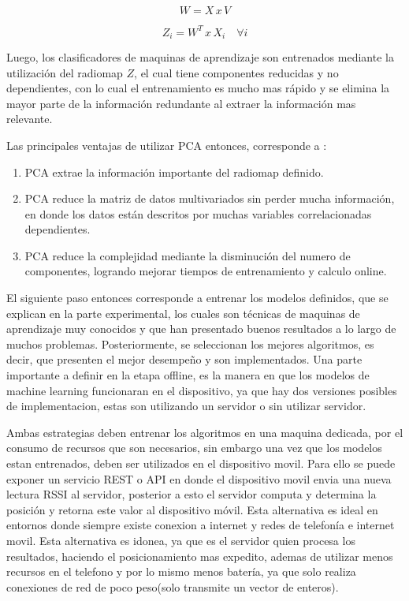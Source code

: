 $$ W = X \, x \, V$$

$$ Z_{i} = W^{T} \, x \, X_{i} \quad \forall i$$

Luego, los clasificadores de maquinas de aprendizaje son entrenados mediante la utilización del radiomap $Z$, el cual tiene componentes reducidas y no dependientes, con lo cual el entrenamiento es mucho mas rápido y se elimina la mayor parte de la información redundante al extraer la información mas relevante.

Las principales ventajas de utilizar PCA entonces, corresponde a \citep{7743586}:

\begin{enumerate}
\item PCA extrae la información importante del radiomap definido.

\item PCA reduce la matriz de datos multivariados sin perder mucha información, en donde los datos están descritos por muchas variables correlacionadas dependientes.

\item PCA reduce la complejidad mediante la disminución del numero de componentes, logrando mejorar tiempos de entrenamiento y calculo online.
\end{enumerate}


El siguiente paso entonces corresponde a entrenar los modelos definidos, que se explican en la parte experimental, los cuales son técnicas de maquinas de aprendizaje muy conocidos y que han presentado buenos resultados a lo largo de muchos problemas. Posteriormente, se seleccionan los mejores algoritmos, es decir, que presenten el mejor desempeño y son implementados. Una parte importante a definir en la etapa offline, es la manera en que los modelos de machine learning funcionaran en el dispositivo, ya que hay dos versiones posibles de implementacion, estas son utilizando un servidor o sin utilizar servidor. 

Ambas estrategias deben entrenar los algoritmos en una maquina dedicada, por el consumo de recursos que son necesarios, sin embargo una vez que los modelos estan entrenados, deben ser utilizados en el dispositivo movil. Para ello se puede exponer un servicio REST o API en donde el dispositivo movil envia una nueva lectura RSSI al servidor, posterior a esto el servidor computa y determina la posición y retorna este valor al dispositivo móvil. Esta alternativa es ideal en entornos donde siempre existe conexion a internet y redes de telefonía e internet movil. Esta alternativa es idonea, ya que es el servidor quien procesa los resultados, haciendo el posicionamiento mas expedito, ademas de utilizar menos recursos en el telefono y por lo mismo menos batería, ya que solo realiza conexiones de red de poco peso(solo transmite un vector de enteros).

